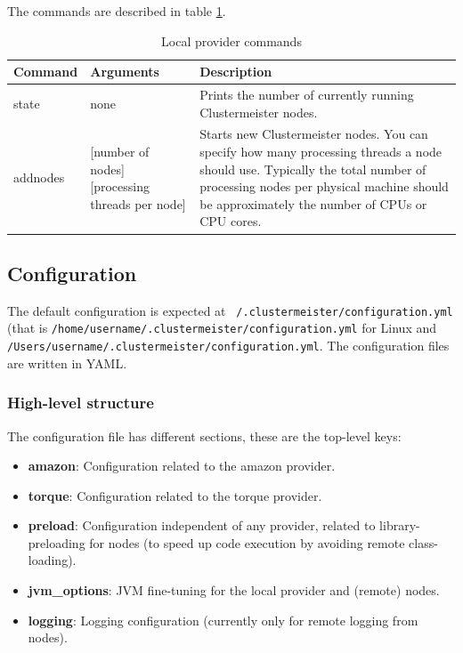 \documentclass{article}
\begin{document}
The commands are described in table \ref{tab:localprovider}.

\begin{table}[h]
\centering
\begin{tabular}{|l| p{3cm} | p{6cm}|}
\hline
\textbf{Command} & \textbf{Arguments} & \textbf{Description} \\ \hline
state & none & Prints the number of currently running Clustermeister nodes. \\ \hline
addnodes & [number of nodes] [processing threads per node] & Starts new Clustermeister nodes. You can specify how many processing threads a node should use. Typically the total number of processing nodes per physical machine should be approximately the number of CPUs or CPU cores. \\ \hline
\end{tabular}
\caption{Local provider commands}
\label{tab:localprovider}
\end{table}


\subsection{Configuration}

The default configuration is expected at \texttt{~/.clustermeister/configuration.yml} (that is \texttt{/home/username/.clustermeister/configuration.yml} for Linux and \texttt{/Users/username/.clustermeister/configuration.yml}. The configuration files are written in YAML.

\subsubsection{High-level structure}

The configuration file has different sections, these are the top-level keys:

\begin{itemize}
 \item \textbf{amazon}: Configuration related to the amazon provider.
 \item \textbf{torque}: Configuration related to the torque provider.
 \item \textbf{preload}: Configuration independent of any provider, related to library-preloading for nodes (to speed up code execution by avoiding remote class-loading).
 \item \textbf{jvm\_options}: JVM fine-tuning for the local provider and (remote) nodes.
 \item \textbf{logging}: Logging configuration (currently only for remote logging from nodes).
\end{itemize}
\end{document}
